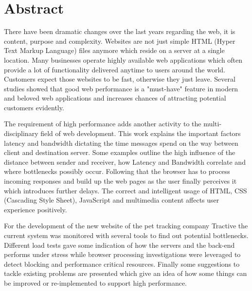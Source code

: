 \chapter*{Abstract}

There have been dramatic changes over the last years regarding the web, it is content, purpose and complexity. Websites are not just simple HTML (Hyper Text Markup Language) files anymore which reside on a server at a single location. Many businesses operate highly available web applications which often provide a lot of functionality delivered anytime to users around the world. Customers expect those websites to be fast, otherwise they just leave. Several studies showed that good web performance is a "must-have" feature in modern and beloved web applications and increases chances of attracting potential customers evidently. 

The requirement of high performance adds another activity to the multi-disciplinary field of web development. This work explains the important factors latency and bandwidth dictating the time messages spend on the way between client and destination server. Some examples outline the high influence of the distance between sender and receiver, how Latency and Bandwidth correlate and where bottlenecks possibly occur. Following that the browser has to process incoming responses and build up the web pages as the user finally perceives it which introduces further delays. The correct and intelligent usage of HTML, CSS (Cascading Style Sheet), JavaScript and multimedia content affects user experience positively. 

For the development of the new website of the pet tracking company Tractive the current system was monitored with several tools to find out potential bottlenecks. Different load tests gave some indication of how the servers and the back-end performs under stress while browser processing investigations were leveraged to detect blocking and performance critical resources. Finally some suggestions to tackle existing problems are presented which give an idea of how some things can be improved or re-implemented to support high performance.